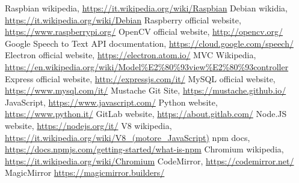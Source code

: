 \begin{thebibliography}{99}
\raggedright

 Raspbian wikipedia, \url{https://it.wikipedia.org/wiki/Raspbian}
 Debian wikidia, \url{https://it.wikipedia.org/wiki/Debian}
 Raspberry official website, \url{https://www.raspberrypi.org/}
 OpenCV official website, \url{http://opencv.org/}
 Google Speech to Text API documentation, \url{https://cloud.google.com/speech/}
 Electron official website, \url{https://electron.atom.io/}
 MVC Wikipedia, \url{https://en.wikipedia.org/wiki/Model%E2%80%93view%E2%80%93controller}
 Express official website, \url{http://expressjs.com/it/}
 MySQL official website, \url{https://www.mysql.com/it/}
 Mustache Git Site, \url{https://mustache.github.io/}
 JavaScript, \url{https://www.javascript.com/}
 Python website, \url{https://www.python.it/}
 GitLab website, \url{https://about.gitlab.com/}
 Node.JS website, \url{https://nodejs.org/it/}
 V8 wikipedia, \url{https://it.wikipedia.org/wiki/V8_(motore_JavaScript)}
 npm docs, \url{https://docs.npmjs.com/getting-started/what-is-npm}
 Chromium wikipedia, \url{https://it.wikipedia.org/wiki/Chromium}
 CodeMirror, \url{https://codemirror.net/}
 MagicMirror \url{https://magicmirror.builders/}

\end{thebibliography}

